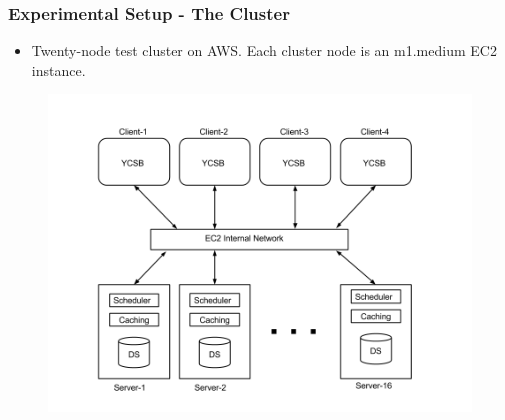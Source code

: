 \documentclass{beamer}
\begin{document}


\begin{frame}
  \frametitle{Experimental Setup - The Cluster}
  \begin{itemize}
  \item Twenty-node test cluster on AWS. Each cluster node is an m1.medium
    EC2 instance.
  \end{itemize}
  \begin{figure}
    \begin{center}
      \centerline{\includegraphics[scale=0.25]{img/Experimental_Setup.png}}
    \end{center}
  \end{figure}
\end{frame}
\end{document}
